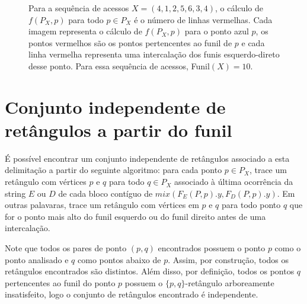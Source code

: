 \begin{figure}
    \caption{Para a sequência de acessos $X = (4,1,2,5,6,3,4)$, o cálculo de $f(P_X,p)$ para todo $p \in P_X$ é o número de linhas vermelhas. Cada imagem representa o cálculo de $f(P_X,p)$ para o ponto azul $p$, os pontos vermelhos são os pontos pertencentes ao funil de $p$ e cada linha vermelha representa uma intercalação dos funis esquerdo-direto desse ponto. Para essa sequência de acessos, Funil$(X) = 10$.}
\label{fig:funil-execucao}
\end{figure}

\section{Conjunto independente de retângulos a partir do funil}

É possível encontrar um conjunto independente de retângulos associado a esta delimitação a partir do seguinte algoritmo: para cada ponto $p \in P_X$, trace um retângulo com vértices $p$ e $q$ para todo $q \in P_X$ associado à última ocorrência da string $E$ ou $D$ de cada bloco contíguo de $mix(F_E(P,p).y, F_D(P,p).y)$. Em outras palavaras, trace um retângulo com vértices em $p$ e $q$ para todo ponto $q$ que for o ponto mais alto do funil esquerdo ou do funil direito antes de uma intercalação.

Note que todos os pares de ponto $(p,q)$ encontrados possuem o ponto $p$ como o ponto analisado e $q$ como pontos abaixo de $p$. Assim, por construção, todos os retângulos encontrados são distintos. Além disso, por definição, todos os pontos $q$ pertencentes ao funil do ponto $p$ possuem o $\{p,q\}$-retângulo arboreamente insatisfeito, logo o conjunto de retângulos encontrado é independente.

